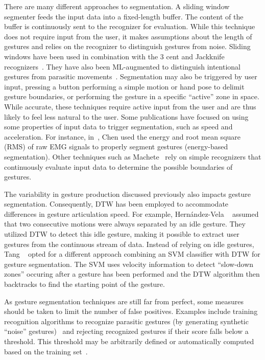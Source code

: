 There are many different approaches to segmentation.
% 
A sliding window segmenter feeds the input data into a fixed-length buffer. The content of the buffer is continuously sent to the recognizer for evaluation. While this technique does not require input from the user, it makes assumptions about the length of gestures and relies on the recognizer to distinguish gestures from noise. Sliding windows have been used in combination with the 3 cent and Jackknife recognizers~\cite{Caputo:2019, Taranta:2017}. They have also been ML-augmented to distinguish intentional gestures from parasitic movements~\cite{Kratz:2016}. 
%
Segmentation may also be triggered by user input, \eg pressing a button performing a simple motion or hand pose to delimit gesture boundaries, or performing the gesture in a specific ``active'' zone in space. While accurate, these techniques require active input from the user and are thus likely to feel less natural to the user.
% 
Some publications have focused on using some properties of input data to trigger segmentation, such as speed and acceleration. For instance, in~\cite{Chen:2016}, Chen \etal used the energy and root mean square (RMS) of raw EMG signals to properly segment gestures (energy-based segmentation). 
%
Other techniques such as Machete~\cite{Taranta:2021} rely on simple recognizers that continuously evaluate input data to determine the possible boundaries of gestures.

The variability in gesture production discussed previously also impacts gesture segmentation. Consequently, DTW has been employed to accommodate differences in gesture articulation speed. 
%
For example, Hernández-Vela \etal~\cite{HernandezVela:2014} assumed that two consecutive motions were always separated by an idle gesture. They utilized DTW to detect this idle gesture, making it possible to extract user gestures from the continuous stream of data.
%
Instead of relying on idle gestures, Tang \etal~\cite{Tang:2018} opted for a different approach combining an SVM classifier with DTW for gesture segmentation. The SVM uses velocity information to detect ``slow-down zones'' occuring after a gesture has been performed and the DTW algorithm then backtracks to find the starting point of the gesture.

As gesture segmentation techniques are still far from perfect, some measures should be taken to limit the number of false positives. Examples include training recognition algorithms to recognize parasitic gestures (\eg by generating synthetic ``noise'' gestures)~\cite{Taranta:2017} and rejecting recognized gestures if their score falls below a threshold. This threshold may be arbitrarily defined or automatically computed based on the training set~\cite{Caputo:2019}.


